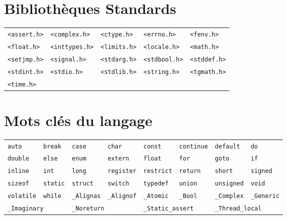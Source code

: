 \documentclass{article}
\newcommand{\any}{$\hzigzag$~}
\newcommand{\cd}{\lstinline}
\begin{document}
\begin{multicols*}{3}

\section*{Bibliothèques Standards}
  \begin{tabularx}{\linewidth}{XXXXX}
    \cd{<assert.h>} & \cd{<complex.h>}  & \cd{<ctype.h>}  & \cd{<errno.h>}   & \cd{<fenv.h>} \\
    \cd{<float.h>}  & \cd{<inttypes.h>} & \cd{<limits.h>} & \cd{<locale.h>}  & \cd{<math.h>} \\
    \cd{<setjmp.h>} & \cd{<signal.h>}   & \cd{<stdarg.h>} & \cd{<stdbool.h>} & \cd{<stddef.h>} \\
    \cd{<stdint.h>} & \cd{<stdio.h>}    & \cd{<stdlib.h>} & \cd{<string.h>}  & \cd{<tgmath.h>} \\
    \cd{<time.h>}   &              &            &             & \\
  \end{tabularx}

\section*{Mots clés du langage}
  \begin{tabularx}{\linewidth}{XXXXXXXX}
    \cd{auto} &
    \cd{break} &
    \cd{case} &
    \cd{char} &
    \cd{const} &
    \cd{continue} &
    \cd{default} &
    \cd{do} \\
    \cd{double} &
    \cd{else} &
    \cd{enum} &
    \cd{extern} &
    \cd{float} &
    \cd{for} &
    \cd{goto} &
    \cd{if} \\
    \cd{inline} &
    \cd{int} &
    \cd{long} &
    \cd{register} &
    \cd{restrict} &
    \cd{return} &
    \cd{short} &
    \cd{signed} \\
    \cd{sizeof} &
    \cd{static} &
    \cd{struct} &
    \cd{switch} &
    \cd{typedef} &
    \cd{union} &
    \cd{unsigned} &
    \cd{void} \\
    \cd{volatile} &
    \cd{while} &
    \cd{_Alignas} &
    \cd{_Alignof} &
    \cd{_Atomic} &
    \cd{_Bool} &
    \cd{_Complex} &
    \cd{_Generic} \\
    \multicolumn{2}{l}{\cd{_Imaginary}} &
    \multicolumn{2}{l}{\cd{_Noreturn}} &
    \multicolumn{2}{l}{\cd{_Static_assert}} &
    \multicolumn{2}{l}{\cd{_Thread_local}}
  \end{tabularx}

\end{multicols*}
\end{document}
